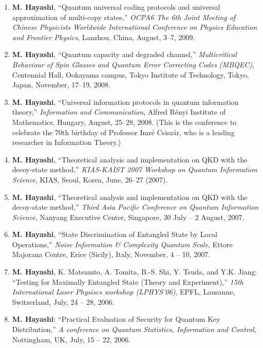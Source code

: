 \documentclass[a4paper,12pt,oneside]{article}
\begin{document}
\begin{enumerate}
\item 
\textbf{M. Hayashi}, 
``Quantum universal coding protocols and universal approximation of multi-copy states,'' 
{\em OCPA6 The 6th Joint Meeting of Chinese Physicists Worldwide International Conference on Physics Education and Frontier Physics}, 
Lanzhou, China, August, 3--7, 2009.

\item 
\textbf{M. Hayashi}, ``Quantum capacity and degraded channel,'' 
{\em Multicritical Behaviour of Spin Glasses and Quantum Error Correcting Codes (MBQEC)}, 
Centennial Hall, Ookayama campus, Tokyo Institute of Technology, Tokyo, Japan, November, 17--19, 2008.

\item 
\textbf{M. Hayashi}, ``Universal information protocols in quantum information theory,'' 
{\em Information and Communication}, 
Alfred R\'{e}nyi Institute of Mathematics, Hungary, August, 25--28, 2008.
(This is the conference 
to celebrate the 70th birthday of Professor Imr\'{e} Csisz\'{a}r,
who is a leading researcher in Information Theory.)

\item
\textbf{M. Hayashi}, ``Theoretical analysis and implementation on QKD with the decoy-state method,'' 
{\em KIAS-KAIST 2007 Workshop on Quantum Information Science}, KIAS, Seoul, Korea, June, 26--27 (2007).

\item
\textbf{M. Hayashi}, ``Theoretical analysis and implementation on QKD with the decoy-state method,'' 
{\em Third Asia Pacific Conference on Quantum Information Science}, 
Nanyang Executive Center, Singapore, 
30 July -- 2 August, 2007.

\item
\textbf{M. Hayashi}, ``State Discrimination of Entangled State by Local Operations,'' 
{\em Noise Information \& Complexity \@ Quantum Scale}, Ettore Majorana Centre, Erice (Sicily), Italy, November, 4 -- 10, 2007.


\item
\textbf{M. Hayashi}, K. Matsumto, A. Tomita, B.-S. Shi, Y. Tsuda, and Y.K. Jiang: ``Testing for Maximally Entangled State (Theory and Experiment),'' 
{\em 15th International Laser Physiscs workshop (LPHYS'06)}, EPFL, Lausanne, Switzerland, 
July, 24 -- 28, 2006.

\item
\textbf{M. Hayashi}: ``Practical Evaluation of Security for Quantum Key Distribution,'' 
{\em A conference on Quantum Statistics, Information and Control}, Nottingham, UK, July, 15 -- 22, 2006.


\end{enumerate}
\end{document}
